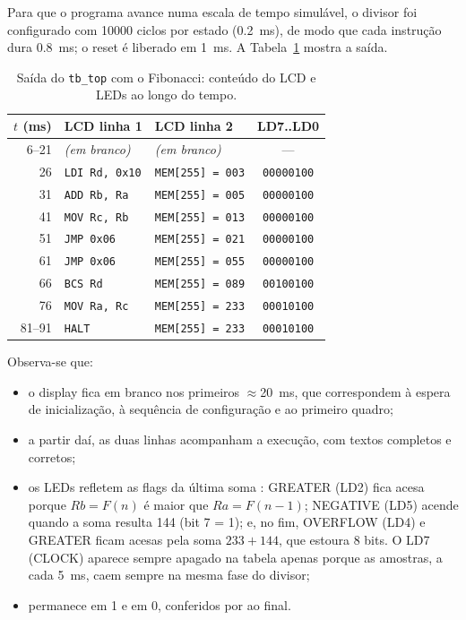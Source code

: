 Para que o programa avance numa escala de tempo simulável, o divisor foi
configurado com \num{10000} ciclos por estado (\SI{0,2}{\milli\second}), de modo
que cada instrução dura \SI{0,8}{\milli\second}; o reset é liberado em
\SI{1}{\milli\second}. A Tabela~\ref{tab:tbtop} mostra a saída.

\begin{table}[H]
\centering
\caption{Saída do \texttt{tb\_top} com o Fibonacci: conteúdo do LCD e LEDs ao longo do tempo.}
\label{tab:tbtop}
\small
\begin{tabular}{r l l c}
\toprule
$t$ (ms) & LCD linha 1 & LCD linha 2 & LD7..LD0 \\
\midrule
6--21 & \textit{(em branco)} & \textit{(em branco)} & --- \\
26 & \texttt{LDI Rd, 0x10} & \texttt{MEM[255] = 003} & \texttt{00000100} \\
31 & \texttt{ADD Rb, Ra}   & \texttt{MEM[255] = 005} & \texttt{00000100} \\
41 & \texttt{MOV Rc, Rb}   & \texttt{MEM[255] = 013} & \texttt{00000100} \\
51 & \texttt{JMP 0x06}     & \texttt{MEM[255] = 021} & \texttt{00000100} \\
61 & \texttt{JMP 0x06}     & \texttt{MEM[255] = 055} & \texttt{00000100} \\
66 & \texttt{BCS Rd}       & \texttt{MEM[255] = 089} & \texttt{00100100} \\
76 & \texttt{MOV Ra, Rc}   & \texttt{MEM[255] = 233} & \texttt{00010100} \\
81--91 & \texttt{HALT}     & \texttt{MEM[255] = 233} & \texttt{00010100} \\
\bottomrule
\end{tabular}
\end{table}

Observa-se que:
\begin{itemize}[nosep]
  \item o display fica em branco nos primeiros $\approx$\SI{20}{\milli\second},
        que correspondem à espera de inicialização, à sequência de
        configuração e ao primeiro quadro;
  \item a partir daí, as duas linhas acompanham a execução, com textos
        completos e corretos;
  \item os LEDs refletem as flags da última soma : GREATER
        (LD2) fica acesa porque $Rb = F(n)$ é maior que $Ra = F(n-1)$;
        NEGATIVE (LD5) acende quando a soma resulta 144 (bit 7 = 1); e, no
        fim, OVERFLOW (LD4) e GREATER ficam acesas pela soma $233 + 144$, que
        estoura 8 bits. O LD7 (CLOCK) aparece sempre apagado na tabela apenas
        porque as amostras, a cada \SI{5}{\milli\second}, caem sempre na mesma
        fase do divisor;
  \item {} permanece em 1 e  em 0, conferidos por
         ao final.
\end{itemize}
